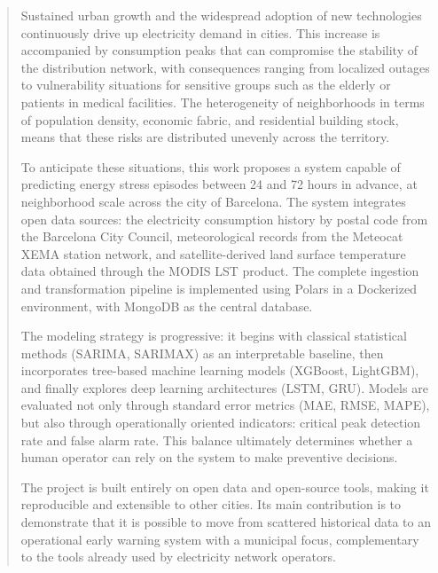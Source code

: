 \documentclass[12pt, a4paper]{article}
\begin{document}
\newpage

\renewcommand{\abstractname}{Abstract}
\begin{abstract}
Sustained urban growth and the widespread adoption of new technologies continuously drive up electricity demand in cities. This increase is accompanied by consumption peaks that can compromise the stability of the distribution network, with consequences ranging from localized outages to vulnerability situations for sensitive groups such as the elderly or patients in medical facilities. The heterogeneity of neighborhoods in terms of population density, economic fabric, and residential building stock, means that these risks are distributed unevenly across the territory.

To anticipate these situations, this work proposes a system capable of predicting energy stress episodes between 24 and 72 hours in advance, at neighborhood scale across the city of Barcelona. The system integrates open data sources: the electricity consumption history by postal code from the Barcelona City Council, meteorological records from the Meteocat XEMA station network, and satellite-derived land surface temperature data obtained through the MODIS LST product. The complete ingestion and transformation pipeline is implemented using Polars in a Dockerized environment, with MongoDB as the central database.

The modeling strategy is progressive: it begins with classical statistical methods (SARIMA, SARIMAX) as an interpretable baseline, then incorporates tree-based machine learning models (XGBoost, LightGBM), and finally explores deep learning architectures (LSTM, GRU). Models are evaluated not only through standard error metrics (MAE, RMSE, MAPE), but also through operationally oriented indicators: critical peak detection rate and false alarm rate. This balance ultimately determines whether a human operator can rely on the system to make preventive decisions.

The project is built entirely on open data and open-source tools, making it reproducible and extensible to other cities. Its main contribution is to demonstrate that it is possible to move from scattered historical data to an operational early warning system with a municipal focus, complementary to the tools already used by electricity network operators.
\end{abstract}

\newpage
\tableofcontents
\newpage

\end{document}
